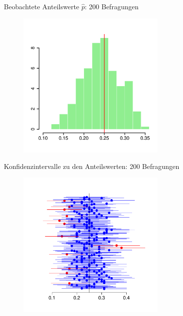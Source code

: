 \documentclass[usenames,dvipsnames,handout]{beamer}
\begin{document}
\begin{frame}{Beobachtete Anteilswerte $\hat{p}$: 200 Befragungen}
  \begin{figure}[ht]
 	\centering
 	      \includegraphics[width=0.65\textwidth]{prob_est200.pdf}%
 	\end{figure}
\end{frame}

\begin{frame}{Konfidenzintervalle zu den Anteilswerten: 200 Befragungen}
  \begin{figure}[ht]
 	\centering
 	      \includegraphics[width=0.65\textwidth]{confi200.pdf}%
 	\end{figure}
\end{frame}
\end{document}
